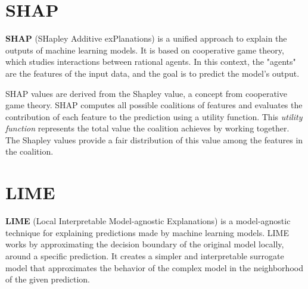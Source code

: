 \section{SHAP}
\textbf{SHAP} (SHapley Additive exPlanations) is a unified approach to explain
the outputs of machine learning models. It is based on cooperative game theory,
which studies interactions between rational agents. In this context, the "agents"
are the features of the input data, and the goal is to predict the model's output.

SHAP values are derived from the Shapley value, a concept from cooperative game
theory. SHAP computes all possible coalitions of features and evaluates the
contribution of each feature to the prediction using a utility function. This
\textit{utility function} represents the total value the coalition achieves by
working together. The Shapley values provide a fair distribution of this value
among the features in the coalition.

\section{LIME}
\textbf{LIME} (Local Interpretable Model-agnostic Explanations) is a model-agnostic
technique for explaining predictions made by machine learning models. LIME works
by approximating the decision boundary of the original model locally, around a
specific prediction. It creates a simpler and interpretable surrogate model that
approximates the behavior of the complex model in the neighborhood of the given
prediction.
